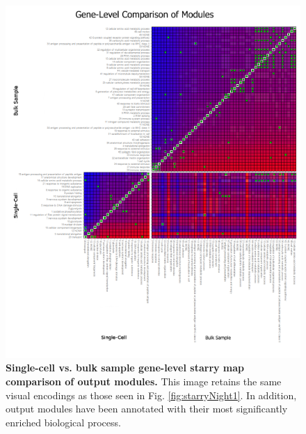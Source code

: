 \documentclass[10pt,letterpaper]{article}
\begin{document}
\begin{figure}[h]
\centering
\includegraphics[width=125mm]{Figures/moduleCompareStaryMap2}
\caption{\textbf{Single-cell vs. bulk sample gene-level starry map comparison of output modules.} This image retains the same visual encodings as those seen in Fig. \ref{fig:starryNight1}. In addition, output modules have been annotated with their most significantly enriched biological process.}
\label{fig:starryMap2}
\end{figure}
\end{document}
